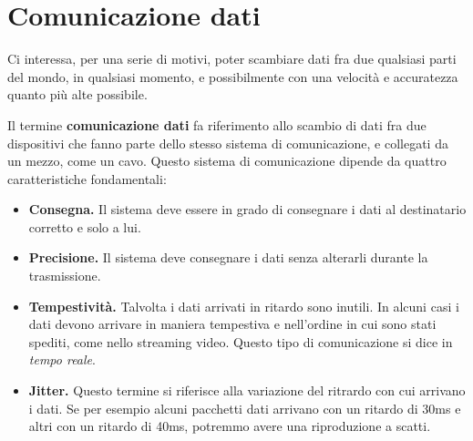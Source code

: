 \section{Comunicazione dati}
    Ci interessa, per una serie di motivi, poter scambiare dati fra due qualsiasi parti del mondo, in qualsiasi momento, e possibilmente con una velocità e accuratezza quanto più alte possibile.
    
    Il termine \textbf{comunicazione dati} fa riferimento allo scambio di dati fra due dispositivi che fanno parte dello stesso sistema di comunicazione, e collegati da un mezzo, come un cavo. Questo sistema di comunicazione dipende da quattro caratteristiche fondamentali:
    \begin{itemize}
        \item \textbf{Consegna.} Il sistema deve essere in grado di consegnare i dati al destinatario corretto e solo a lui.
        
        \item \textbf{Precisione.} Il sistema deve consegnare i dati senza alterarli durante la trasmissione.
        
        \item \textbf{Tempestività.} Talvolta i dati arrivati in ritardo sono inutili. In alcuni casi i dati devono arrivare in maniera tempestiva e nell'ordine in cui sono stati spediti, come nello streaming video. Questo tipo di comunicazione si dice in \textit{tempo reale}.
        
        \item \textbf{Jitter.} Questo termine si riferisce alla variazione del ritrardo con cui arrivano i dati. Se per esempio alcuni pacchetti dati arrivano con un ritardo di 30ms e altri con un ritardo di 40ms, potremmo avere una riproduzione a scatti.
    \end{itemize}
    
